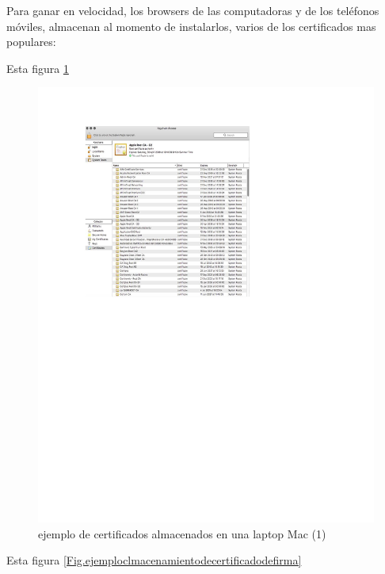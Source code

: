 \documentclass[12pt]{report} %
\begin{document}
\begin{itemize}
Para ganar en velocidad, los browsers de las computadoras y de los teléfonos móviles,  almacenan al momento de instalarlos, varios de los certificados mas populares:

Esta figura \ref{Fig.certificadofirma}


\begin{figure}
\centering
\includegraphics[width=0.85\columnwidth]{imagenes/certificadofirmaej.pdf}
\caption{ejemplo de certificados almacenados en una laptop Mac (1)}
\label{Fig.certificadofirma}
\end{figure} 

Esta figura \ref{Fig.ejemploclmacenamientodecertificadodefirma}


\end{itemize}
\end{document}
